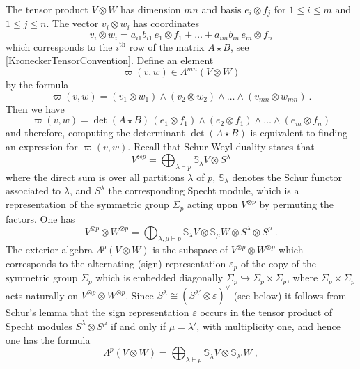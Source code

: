 \documentclass[10pt]{amsart}
\theoremstyle{definition}
\theoremstyle{remark}
\numberwithin{equation}{section}
\newcommand{\bwedge}{\mathsf{\Lambda}}
\newcommand{\0}{\color{blue}{\mathsf{0}}}
\begin{document}
The tensor product $V\otimes W$ has dimension $mn$ and basis $e_i \otimes f_j$ for $1\leq i\leq m$ and $1\leq j \leq n$. The vector $v_i \otimes w_i$ has coordinates
\[ v_i \otimes w_i = a_{i1} b_{i1} \,  e_1\otimes f_1 + \ldots + a_{im} b_{in} \, e_m \otimes f_n \]
which corresponds to the $i^\mathrm{th}$ row of the matrix $A\star B$, see \eqref{KroneckerTensorConvention}.   
Define an element
\[   
\varpi(v,w)   \in    \bwedge^{mn} \left( V\otimes W\right) \]
by the formula
\begin{equation}  \label{inproofomegavw}  
\varpi(v,w) =   \left( v_1\otimes w_1\right) \wedge  \left( v_2\otimes w_2\right) \wedge \ldots \wedge \left( v_{mn}\otimes w_{mn}\right)\ .  
\end{equation} 
Then we have
 \begin{equation} \label{piece1}  \varpi(v,w)   =  \det(A\star B) \,  (e_1 \otimes f_1) \wedge (e_2 \otimes f_1) \wedge \ldots  \wedge (e_m \otimes f_n) \end{equation}
 and therefore,  computing the determinant $\det(A\star B)$ is equivalent to finding an expression for $ \varpi(v,w)$. 
Recall that Schur-Weyl duality states that 
\[ V^{\otimes p} = \bigoplus_{\lambda\vdash p}  \mathbb{S}_{\lambda} V \otimes S^{\lambda}\]
 where the direct sum is over all partitions $\lambda$ of $p$,  $\mathbb{S}_{\lambda} $ denotes the Schur functor associated to $\lambda$, and $S^{\lambda}$ the corresponding Specht module, which  is a representation of the symmetric group $\Sigma_p$ acting upon $V^{\otimes p}$ by permuting the factors. 
One has
 \[ V^{\otimes p} \otimes W^{\otimes p}  = \bigoplus_{\lambda, \mu \vdash p}  \mathbb{S}_{\lambda} V \otimes  \mathbb{S}_{\mu} W  \otimes S^{\lambda} \otimes S^{\mu} \ . \]
The exterior algebra $\bwedge^{p} ( V\otimes W)$ is the subspace of $V^{\otimes p} \otimes W^{\otimes p}$  which corresponds  to the  alternating (sign) representation $\varepsilon_p$ of the copy of the symmetric group $\Sigma_p$ which is embedded diagonally $\Sigma_{p} \hookrightarrow \Sigma_p \times \Sigma_p$, where $\Sigma_p \times \Sigma_p$  acts naturally on $V^{\otimes p} \otimes W^{\otimes p}$. 
 Since $S^{\lambda} \cong (S^{\lambda'} \otimes \varepsilon)^{\vee}$ (see below) it follows from Schur's lemma that the sign representation $\varepsilon$ occurs in 
  the tensor product of Specht modules $S^{\lambda} \otimes S^{\mu}$ if and only if $\mu = \lambda'$, with multiplicity  one,  and hence one has the formula 
   \[  \bwedge^p \left( V \otimes W \right)  = \bigoplus_{\lambda\vdash p}  \mathbb{S}_{\lambda} V \otimes  \mathbb{S}_{\lambda'} W    \ , \]
\end{document}

